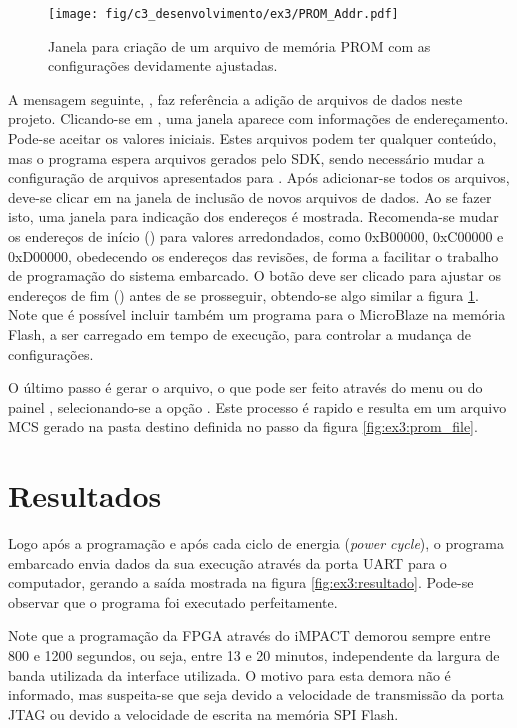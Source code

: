 \documentclass[11pt,a4paper,oneside]{book}
\begin{document}
\begin{figure}[htp]
\centering
\texttt{[image: fig/c3\_desenvolvimento/ex3/PROM\_Addr.pdf]}
\caption{Janela para criação de um arquivo de memória PROM com as configurações devidamente ajustadas.}
\label{fig:ex3:prom_addr}
\end{figure}

A mensagem seguinte, , faz referência a adição de arquivos de dados neste projeto.
Clicando-se em , uma janela aparece com informações de endereçamento.
Pode-se aceitar os valores iniciais.
Estes arquivos podem ter qualquer conteúdo, mas o programa espera arquivos gerados pelo SDK, sendo necessário mudar a configuração de arquivos apresentados para .
Após adicionar-se todos os arquivos, deve-se clicar em  na janela de inclusão de novos arquivos de dados.
Ao se fazer isto, uma janela para indicação dos endereços é mostrada.
Recomenda-se mudar os endereços de início () para valores arredondados, como 0xB00000, 0xC00000 e 0xD00000, obedecendo os endereços das revisões, de forma a facilitar o trabalho de programação do sistema embarcado.
O botão  deve ser clicado para ajustar os endereços de fim () antes de se prosseguir, obtendo-se algo similar a figura \ref{fig:ex3:prom_addr}.
Note que é possível incluir também um programa para o MicroBlaze na memória Flash, a ser carregado em tempo de execução, para controlar a mudança de configurações.

O último passo é gerar o arquivo, o que pode ser feito através do menu  ou do painel , selecionando-se a opção .
Este processo é rapido e resulta em um arquivo MCS gerado na pasta destino definida no passo da figura \ref{fig:ex3:prom_file}.

\section{Resultados}
Logo após a programação e após cada ciclo de energia (\textit{power cycle}), o programa embarcado envia dados da sua execução através da porta UART para o computador, gerando a saída mostrada na figura \ref{fig:ex3:resultado}.
Pode-se observar que o programa foi executado perfeitamente.

Note que a programação da FPGA através do iMPACT demorou sempre entre 800 e 1200 segundos, ou seja, entre 13 e 20 minutos, independente da largura de banda utilizada da interface utilizada.
O motivo para esta demora não é informado, mas suspeita-se que seja devido a velocidade de transmissão da porta JTAG ou devido a velocidade de escrita na memória SPI Flash.
\end{document}
